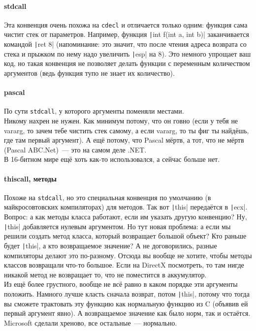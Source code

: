 \documentclass{article}
\begin{document}
    \paragraph{stdcall}
    Эта конвенция очень похожа на \Verb|cdecl| и отличается только одним: функция сама чистит стек от параметров. Например, функция \texttt|int f(int a, int b)| заканчивается командой \texttt|ret 8| (напоминание: это значит, что после чтения адреса возврата со стека и прыжком по нему надо увеличить \texttt|esp| на 8). Это немного упрощает ваш код, но такая конвенция не позволяет делать функции с переменным количеством аргументов (ведь функция тупо не знает их количество).
    \paragraph{pascal}
    По сути \Verb|stdcall|, у которого аргументы поменяли местами.\\
    Никому нахрен не нужен. Как минимум потому, что он говно (если у тебя не vararg, то зачем тебе чистить стек самому, а если vararg, то ты фиг ты найдёшь, где там первый аргумент). А ещё потому, что Pascal мёртв, а тот, что не мёртв (Pascal ABC.Net)~--- это на самом деле .NET.\\
    В 16-битном мире ещё хоть как-то использовался, а сейчас больше нет.
    \paragraph{thiscall, методы}
    Похоже на \Verb|stdcall|, но это специальная конвенция по умолчанию (в майкросовтовских компиляторах) для методов. Так вот \texttt|this| передаётся в \texttt|ecx|.\\
    Вопрос: а как методы класса работают, если им указать другую конвенцию? Ну, \texttt|this| добавляется нулевым аргументом. Но тут новая проблема: а если мы решили создать метод класса, который возвращает большой объект? Кто раньше будет \texttt|this|, а кто возвращаемое значение? А не договорились, разные компиляторы делают это по-разному. Отсюда вы вообще не хотите, чтобы методы классов возвращали что-то большое. Если на DirectX посмотреть, то там нигде никакой метод не возвращает то, что не поместится в аккумулятор.\\
    Из ещё более грустного, вообще не всё равно в каком порядке эти аргументы положить. Намного лучше класть сначала возврат, потом \texttt|this|, потому что тогда вы сможете трактовать эту функцию как нормальную функцию из C (объявив ей первый аргумент явно). А возвращаемое значение как было норм, так и остаётся. Microsoft сделали хреново, все остальные~--- нормально.
\end{document}
